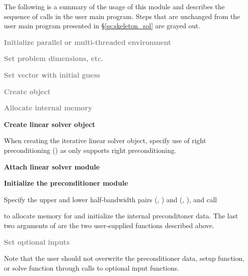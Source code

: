 The following is a summary of the usage of this module and describes the sequence
of calls in the user main program. Steps that are unchanged from the user main
program presented in \S\ref{ss:skeleton_sol} are grayed out.
\begin{Steps}
\item
  \textcolor{gray}{\bf Initialize parallel or multi-threaded environment}

\item
  \textcolor{gray}{\bf Set problem dimensions, etc.}

\item
  \textcolor{gray}{\bf Set vector with initial guess}

\item
  \textcolor{gray}{\bf Create {\kinsol} object}

\item
  \textcolor{gray}{\bf Allocate internal memory}

\item
  {\bf Create linear solver object}

  When creating the iterative linear solver object, specify use of
  right preconditioning () as {\kinsol} only supports right preconditioning.

\item \label{i:bbdpre_attach}
  {\bf Attach linear solver module}

\item \label{i:bbdpre_init}
  {\bf Initialize the {\kinbbdpre} preconditioner module}

  Specify the upper and lower half-bandwidth pairs (, ) and
  (, ), and call


  to allocate memory for and initialize the internal preconditoner data.
  The last two arguments of  are the two user-supplied
  functions described above.

\item
  \textcolor{gray}{\bf Set optional inputs}

  Note that the user should not overwrite the preconditioner data, setup function,
  or solve function through calls to 
  optional input functions.


\end{Steps}
